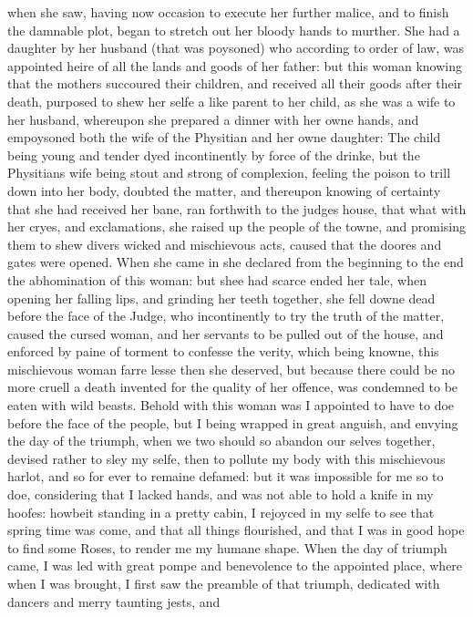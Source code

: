 when she saw, having now occasion to execute her further malice, and to finish
the damnable plot, began to stretch out her bloody hands to murther. She had a
daughter by her husband (that was poysoned) who according to order of law, was
appointed heire of all the lands and goods of her father: but this woman
knowing that the mothers succoured their children, and received all their goods
after their death, purposed to shew her selfe a like parent to her child, as
she was a wife to her husband, whereupon she prepared a dinner with her owne
hands, and empoysoned both the wife of the Physitian and her owne daughter: The
child being young and tender dyed incontinently by force of the drinke, but the
Physitians wife being stout and strong of complexion, feeling the poison to
trill down into her body, doubted the matter, and thereupon knowing of
certainty that she had received her bane, ran forthwith to the judges house,
that what with her cryes, and exclamations, she raised up the people of the
towne, and promising them to shew divers wicked and mischievous acts, caused
that the doores and gates were opened. When she came in she declared from the
beginning to the end the abhomination of this woman: but shee had scarce ended
her tale, when opening her falling lips, and grinding her teeth together, she
fell downe dead before the face of the Judge, who incontinently to try the
truth of the matter, caused the cursed woman, and her servants to be pulled out
of the house, and enforced by paine of torment to confesse the verity, which
being knowne, this mischievous woman farre lesse then she deserved, but because
there could be no more cruell a death invented for the quality of her offence,
was condemned to be eaten with wild beasts. Behold with this woman was I
appointed to have to doe before the face of the people, but I being wrapped in
great anguish, and envying the day of the triumph, when we two should so
abandon our selves together, devised rather to sley my selfe, then to pollute
my body with this mischievous harlot, and so for ever to remaine defamed: but
it was impossible for me so to doe, considering that I lacked hands, and was
not able to hold a knife in my hoofes: howbeit standing in a pretty cabin, I
rejoyced in my selfe to see that spring time was come, and that all things
flourished, and that I was in good hope to find some Roses, to render me my
humane shape. When the day of triumph came, I was led with great pompe and
benevolence to the appointed place, where when I was brought, I first saw the
preamble of that triumph, dedicated with dancers and merry taunting jests, and
